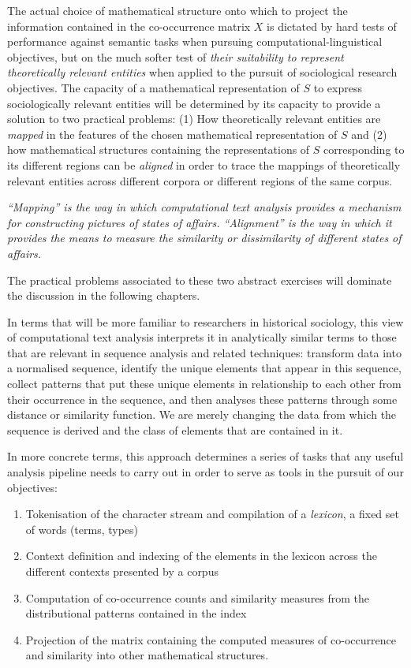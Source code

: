 The actual choice of mathematical structure onto which to project the information contained in the co-occurrence matrix $X$ is dictated by hard tests of performance against semantic tasks when pursuing computational-linguistical objectives, but on the much softer test of \emph{their suitability to represent theoretically relevant entities} when applied to the pursuit of sociological research objectives.
The capacity of a mathematical representation of $S$ to express sociologically relevant entities will be determined by its capacity to provide a solution to two practical problems:
(1) How theoretically relevant entities are \emph{mapped} in the features of the chosen mathematical representation of $S$ and
(2) how mathematical structures containing the representations of $S$ corresponding to its different regions can be \emph{aligned} in order to trace the mappings of theoretically relevant entities across different corpora or different regions of the same corpus.

\emph{
    ``Mapping'' is the way in which computational text analysis provides a mechanism for constructing pictures of states of affairs.
    ``Alignment'' is the way in which it provides the means to measure the similarity or dissimilarity of different states of affairs.
}

The practical problems associated to these two abstract exercises will dominate the discussion in the following chapters.

In terms that will be more familiar to researchers in historical sociology, this view of computational text analysis interprets it in analytically similar terms to those that are relevant in sequence analysis and related techniques: transform data into a normalised sequence, identify the unique elements that appear in this sequence, collect patterns that put these unique elements in relationship to each other from their occurrence in the sequence, and then analyses these patterns through some distance or similarity function.
We are merely changing the data from which the sequence is derived and the class of elements that are contained in it.

In more concrete terms, this approach determines a series of tasks that any useful analysis pipeline needs to carry out in order to serve as tools in the pursuit of our objectives:
\begin{enumerate}
    \item Tokenisation of the character stream and compilation of a \emph{lexicon}, a fixed set of words (terms, types)
    \item Context definition and indexing of the elements in the lexicon across the different contexts presented by a corpus
    \item Computation of co-occurrence counts and similarity measures from the distributional patterns contained in the index
    \item Projection of the matrix containing the computed measures of co-occurrence and similarity into other mathematical structures.
\end{enumerate}

